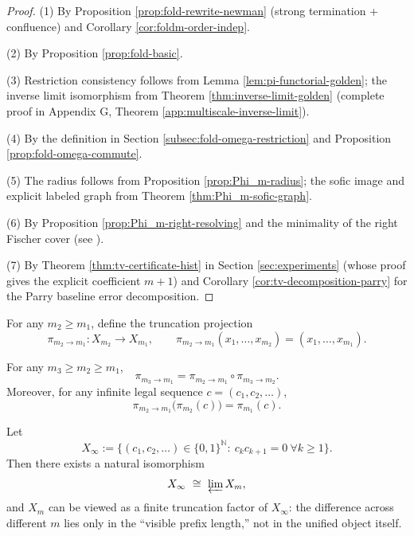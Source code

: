 \begin{proof}
(1) By Proposition \ref{prop:fold-rewrite-newman} (strong termination + confluence) and Corollary \ref{cor:foldm-order-indep}.

(2) By Proposition \ref{prop:fold-basic}.

(3) Restriction consistency follows from Lemma \ref{lem:pi-functorial-golden}; the inverse limit isomorphism from Theorem \ref{thm:inverse-limit-golden} (complete proof in Appendix G, Theorem \ref{app:multiscale-inverse-limit}).

(4) By the definition in Section \ref{subsec:fold-omega-restriction} and Proposition \ref{prop:fold-omega-commute}.

(5) The radius follows from Proposition \ref{prop:Phi_m-radius}; the sofic image and explicit labeled graph from Theorem \ref{thm:Phi_m-sofic-graph}.

(6) By Proposition \ref{prop:Phi_m-right-resolving} and the minimality of the right Fischer cover (see \cite{LindMarcus1995,Kitchens1998SymbolicDynamics}).

(7) By Theorem \ref{thm:tv-certificate-hist} in Section \ref{sec:experiments} (whose proof gives the explicit coefficient $m+1$) and Corollary \ref{cor:tv-decomposition-parry} for the Parry baseline error decomposition.
\end{proof}

\begin{definition}\label{def:pi-m2-m1-golden}
For any $m_2\ge m_1$, define the truncation projection
\[
\pi_{m_2\to m_1}:X_{m_2}\to X_{m_1},\qquad
\pi_{m_2\to m_1}(x_1,\dots,x_{m_2})=(x_1,\dots,x_{m_1}).
\]
\end{definition}

\begin{lemma}[Consistency]\label{lem:pi-functorial-golden}
For any $m_3\ge m_2\ge m_1$,
\[
\pi_{m_3\to m_1}=\pi_{m_2\to m_1}\circ \pi_{m_3\to m_2}.
\]
Moreover, for any infinite legal sequence $c=(c_1,c_2,\dots)$,
\[
\pi_{m_2\to m_1}\bigl(\pi_{m_2}(c)\bigr)=\pi_{m_1}(c).
\]
\end{lemma}

\begin{theorem}\label{thm:inverse-limit-golden}
Let
\[
X_\infty:=\{(c_1,c_2,\dots)\in\{0,1\}^{\mathbb{N}}:\ c_kc_{k+1}=0\ \forall k\ge 1\}.
\]
Then there exists a natural isomorphism
\[
X_\infty\ \cong\ \varprojlim X_m,
\]
and $X_m$ can be viewed as a finite truncation factor of $X_\infty$: the difference across different $m$ lies only in the ``visible prefix length,'' not in the unified object itself.
\end{theorem}

